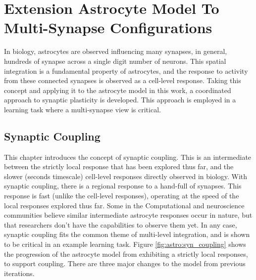 \chapter{Extension Astrocyte Model To Multi-Synapse
  Configurations} \label{chapter:obj3}

In biology, astrocytes are observed influencing many synapses, in general,
hundreds of synapse across a single digit number of neurons. This spatial
integration is a fundamental property of astrocytes, and the response to
activity from these connected synapses is observed as a cell-level \ca
response. Taking this concept and applying it to the astrocyte model
in this work, a coordinated approach to synaptic plasticity is developed. This
approach is employed in a learning task where a multi-synapse view is critical.



  

\section{Synaptic Coupling}
This chapter introduces the concept of synaptic coupling. This is an
intermediate between the strictly local response that has been explored thus
far, and the slower (seconds timescale) cell-level responses directly observed
in biology. With synaptic coupling, there is a regional response to a hand-full
of synapses. This response is fast (unlike the cell-level \ca responses),
operating at the speed of the local responses explored thus far. Some in the
Computational and neuroscience communities believe similar intermediate
astrocyte responses occur in nature, but that researchers don't have the
capabilities to observe them yet. In any case, synaptic coupling fits the common
theme of multi-level integration, and is shown to be critical in an example
learning task. Figure \ref{fig:astro:syn_coupling} shows the progression of the
astrocyte model from exhibiting a strictly local responses, to support
coupling. There are three major changes to the model from previous iterations.

